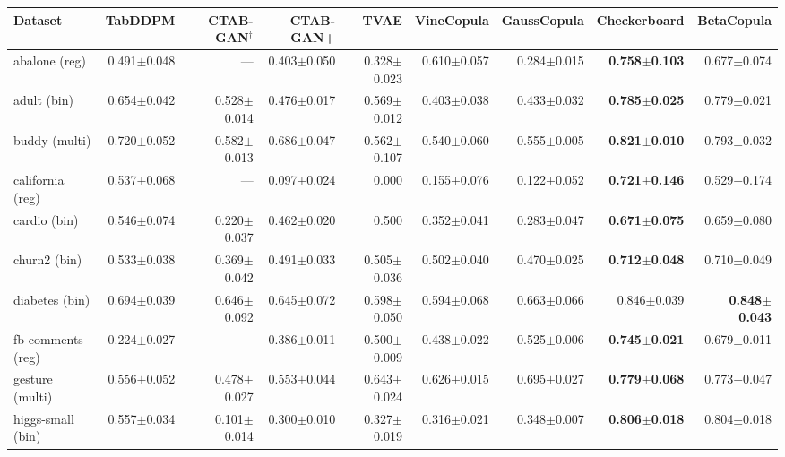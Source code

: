 \begingroup\setlength{\tabcolsep}{2pt}
\begin{tabular}{lrrrrrrrr}
\toprule
Dataset & TabDDPM & CTAB-GAN$^{\dagger}$ & CTAB-GAN+ & TVAE & VineCopula & GaussCopula & Checkerboard & BetaCopula \\
\midrule
abalone (reg) & 0.491$\pm$0.048 & --- & 0.403$\pm$0.050 & 0.328$\pm$0.023 & 0.610$\pm$0.057 & 0.284$\pm$0.015 & \textbf{0.758$\pm$0.103} & 0.677$\pm$0.074 \\
adult (bin) & 0.654$\pm$0.042 & 0.528$\pm$0.014 & 0.476$\pm$0.017 & 0.569$\pm$0.012 & 0.403$\pm$0.038 & 0.433$\pm$0.032 & \textbf{0.785$\pm$0.025} & 0.779$\pm$0.021 \\
buddy (multi) & 0.720$\pm$0.052 & 0.582$\pm$0.013 & 0.686$\pm$0.047 & 0.562$\pm$0.107 & 0.540$\pm$0.060 & 0.555$\pm$0.005 & \textbf{0.821$\pm$0.010} & 0.793$\pm$0.032 \\
california (reg) & 0.537$\pm$0.068 & --- & 0.097$\pm$0.024 & 0.000 & 0.155$\pm$0.076 & 0.122$\pm$0.052 & \textbf{0.721$\pm$0.146} & 0.529$\pm$0.174 \\
cardio (bin) & 0.546$\pm$0.074 & 0.220$\pm$0.037 & 0.462$\pm$0.020 & 0.500 & 0.352$\pm$0.041 & 0.283$\pm$0.047 & \textbf{0.671$\pm$0.075} & 0.659$\pm$0.080 \\
churn2 (bin) & 0.533$\pm$0.038 & 0.369$\pm$0.042 & 0.491$\pm$0.033 & 0.505$\pm$0.036 & 0.502$\pm$0.040 & 0.470$\pm$0.025 & \textbf{0.712$\pm$0.048} & 0.710$\pm$0.049 \\
diabetes (bin) & 0.694$\pm$0.039 & 0.646$\pm$0.092 & 0.645$\pm$0.072 & 0.598$\pm$0.050 & 0.594$\pm$0.068 & 0.663$\pm$0.066 & 0.846$\pm$0.039 & \textbf{0.848$\pm$0.043} \\
fb-comments (reg) & 0.224$\pm$0.027 & --- & 0.386$\pm$0.011 & 0.500$\pm$0.009 & 0.438$\pm$0.022 & 0.525$\pm$0.006 & \textbf{0.745$\pm$0.021} & 0.679$\pm$0.011 \\
gesture (multi) & 0.556$\pm$0.052 & 0.478$\pm$0.027 & 0.553$\pm$0.044 & 0.643$\pm$0.024 & 0.626$\pm$0.015 & 0.695$\pm$0.027 & \textbf{0.779$\pm$0.068} & 0.773$\pm$0.047 \\
higgs-small (bin) & 0.557$\pm$0.034 & 0.101$\pm$0.014 & 0.300$\pm$0.010 & 0.327$\pm$0.019 & 0.316$\pm$0.021 & 0.348$\pm$0.007 & \textbf{0.806$\pm$0.018} & 0.804$\pm$0.018 \\

\end{tabular}
